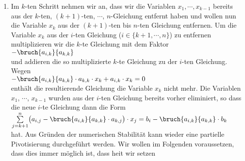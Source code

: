 \begin{enumerate}
      \textbf{Bemerkung}: An dieser Stelle fragen Sie sich vermutlich, was passiert, wenn
      $a_{1,1} = 0$ ist, denn dann ist der Ausdruck $\frac{a_{i,1}}{a_{1,1}}$ offenbar undefiniert.
      In so einem Fall vertauschen wir einfach die erste Gleichung mit einer anderen Gleichung,
      f\"{u}r die der Koeffizient der Variablen $x_1$ von $0$ verschieden ist.  In der Praxis hat es sich
      bew\"{a}hrt, immer die Gleichung als erste zu nehmen, f\"{u}r die der Koeffizient der Variablen $x_1$ den
      gr\"{o}\3ten Betrag hat, denn dadurch fallen die bei  einer numerischen Rechnung zwangsl\"{a}ufig
      auftretenden  Rundungsfehler weniger schwer ins Gewicht als wenn wir die
      Reihenfolge der Gleichungen beliebig w\"{a}hlen.   Diese Verfahren wird als
      \emph{partielle Pivotisierung} bezeichnet.
\item Im $k$-ten Schritt nehmen wir an, dass wir die Variablen $x_1, \cdots, x_{k-1}$ bereits aus 
      der $k$-ten, $(k+1)$-ten, $\cdots$, $n$-Gleichung entfernt haben und wollen nun die 
      Variable $x_k$ aus der $(k+1)$-ten bis $n$-ten Gleichung entfernen. 
      Um die Variable $x_k$ aus der $i$-ten Gleichung ($i \in \{ k+1,\cdots, n\}$)
      zu entfernen multiplizieren wir die $k$-te Gleichung mit dem Faktor
      \\[0.2cm]
      \hspace*{1.3cm}
      $-\bruch{a_{i,k}}{a_{k,k}}$
      \\[0.2cm]
      und addieren die so multiplizierte $k$-te Gleichung zu der $i$-ten Gleichung.  Wegen
      \\[0.2cm]
      \hspace*{1.3cm}
      $-\bruch{a_{i,k}}{a_{k,k}} \cdot a_{k,k} \cdot x_k + a_{i,k} \cdot x_k = 0$
      \\[0.2cm]
      enth\"{a}lt die resultierende Gleichung die Variable $x_k$ nicht mehr.  Die Variablen
      $x_1$, $\cdots$, $x_{k-1}$ wurden aus der $i$-ten Gleichung bereits vorher 
      eliminiert, so dass die neue $i$-te Gleichung
      dann die Form
      \\[0.2cm]
      \hspace*{1.3cm}
      $\sum\limits_{j=k+1}^n \bigl(a_{i,j} - \bruch{a_{i,k}}{a_{k,k}} \cdot a_{k,j}\bigr) \cdot x_j =
       b_{i} - \bruch{a_{i,k}}{a_{k,k}} \cdot b_{k}
      $
      \\[0.2cm]
      hat.   Aus Gr\"{u}nden der numerischen Stabilit\"{a}t kann wieder eine partielle Pivotisierung durchgef\"{u}hrt
      werden.  Wir wollen im Folgenden voraussetzen, dass dies immer m\"{o}glich ist, dass hei\3t wir setzen

\end{enumerate}

